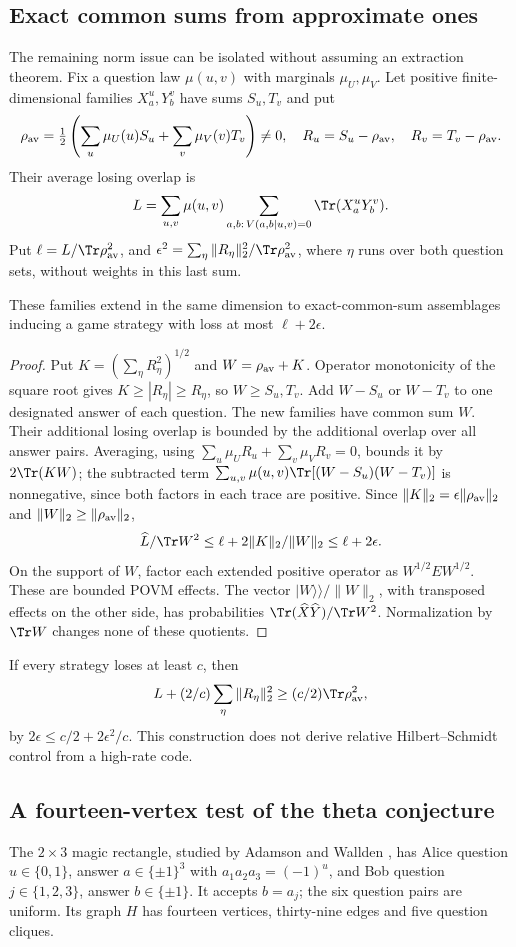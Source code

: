 \subsection{Exact common sums from approximate ones}
The remaining norm issue can be isolated without assuming an extraction
theorem. Fix a question law $\mu(u,v)$ with marginals $\mu_U,\mu_V$. Let positive finite-dimensional families $X_a^u,Y_b^v$ have sums
$S_u,T_v$ and put
\[
 \rho_{\rm av}=\tfrac12\left(\sum_u\mu_U(u)S_u+
                         \sum_v\mu_V(v)T_v\right)\ne0,
 \quad R_u=S_u-\rho_{\rm av},\quad R_v=T_v-\rho_{\rm av}.
\]
Their average losing overlap is
\[
 L=\sum_{u,v}\mu(u,v)\sum_{a,b:\,V(a,b\mid u,v)=0}\Tr(X_a^uY_b^v).
\]
Put
$\ell=L/\Tr\rho_{\rm av}^2$, and
$\epsilon^2=\sum_{\eta}\|R_\eta\|_2^2/\Tr\rho_{\rm av}^2$, where ${\eta}$ runs over both
question sets, without weights in this last sum.
\begin{lemma}\label{lem:commonsum}
These families extend in the same dimension to exact-common-sum
assemblages inducing a game strategy with loss at most $\ell+2\epsilon$.
\end{lemma}
\begin{proof}
Put $K=(\sum_{\eta}R_\eta^2)^{1/2}$ and $W=\rho_{\rm av}+K$. Operator monotonicity of
the square root gives $K\ge|R_\eta|\ge R_\eta$, so $W\ge S_u,T_v$.
Add $W-S_u$ or $W-T_v$ to one designated answer of each question.
The new families have common sum $W$. Their additional losing overlap
is bounded by the additional overlap over all answer pairs. Averaging,
using $\sum_u\mu_U R_u+\sum_v\mu_V R_v=0$, bounds it by $2\Tr(KW)$;
the subtracted term $\sum_{u,v}\mu(u,v)\Tr[(W-S_u)(W-T_v)]$ is nonnegative, since both factors in each trace are positive. Since
$\|K\|_2=\epsilon\|\rho_{\rm av}\|_2$ and $\|W\|_2\ge\|\rho_{\rm av}\|_2$,
\[
 \widehat L/\Tr W^2\le\ell+2\|K\|_2/\|W\|_2\le\ell+2\epsilon.
\]
On the support of $W$, factor each extended positive operator as
$W^{1/2}EW^{1/2}$. These are bounded POVM effects. The vector
$|W\rangle\!\rangle/\|W\|_2$, with transposed effects on the other side,
has probabilities $\Tr(\widehat X\widehat Y)/\Tr W^2$.
Normalization by $\Tr W$ changes none of these quotients.
\end{proof}
If every strategy loses at least $c$, then
\[
 L+(2/c)\sum_{\eta}\|R_\eta\|_2^2\ge(c/2)\Tr\rho_{\rm av}^2,
\]
by $2\epsilon\le c/2+2\epsilon^2/c$. This construction does not derive
relative Hilbert--Schmidt control from a high-rate code.

\subsection{A fourteen-vertex test of the theta conjecture}\label{sec:parity}
The $2\times3$ magic rectangle, studied by Adamson and Wallden
\cite{AW}, has Alice question $u\in\{0,1\}$, answer
$a\in\{\pm1\}^3$ with $a_1a_2a_3=(-1)^u$, and Bob question
$j\in\{1,2,3\}$, answer $b\in\{\pm1\}$. It accepts $b=a_j$;
the six question pairs are uniform. Its graph $H$ has fourteen vertices,
thirty-nine edges and five question cliques.

